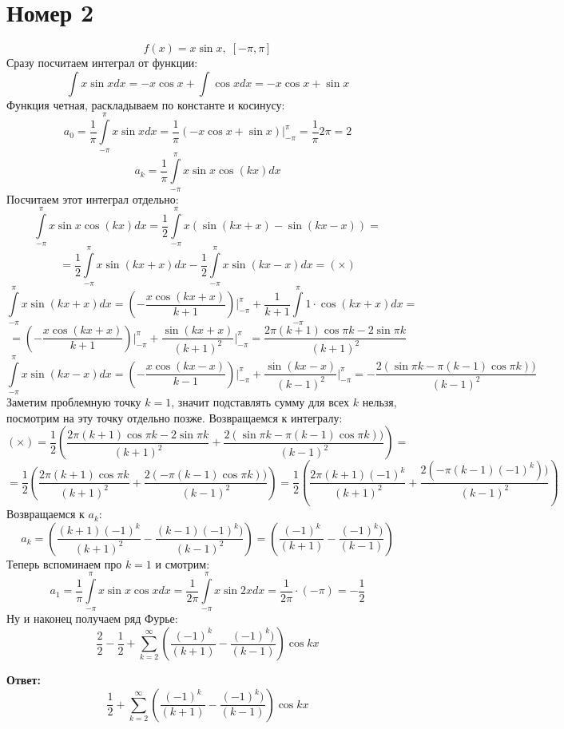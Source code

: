 \documentclass[a4paper,12pt]{article}
\begin{document}
\section*{Номер 2}
\[
f(x) = x \sin x, \; \left[ -\pi, \pi \right]
\]
Сразу посчитаем интеграл от функции:
\[
\int x \sin x dx = - x \cos x + \int \cos x dx = - x \cos x + \sin x
\]
Функция четная, раскладываем по константе и косинусу:
\[
a_0 = \frac{1}{\pi} \int\limits_{-\pi}^{\pi} x \sin x  dx= \frac{1}{\pi} \left(  - x \cos x + \sin x \right) \Bigg|_{-\pi}^{\pi} = \frac{1}{\pi} 2\pi = 2
\]
\[
a_k = \frac{1}{\pi} \int\limits_{-\pi}^{\pi} x \sin x \cos (kx) dx
\]
Посчитаем этот интеграл отдельно:
\[
\int\limits_{-\pi}^{\pi} x \sin x \cos (kx) dx = \frac{1}{2} \int\limits_{-\pi}^{\pi}x \left( \sin (kx + x) -\sin (kx - x)\right) =
\]
\[
=
 \frac{1}{2} \int\limits_{-\pi}^{\pi} x \sin (kx + x) dx -  \frac{1}{2} \int\limits_{-\pi}^{\pi}  x \sin (kx - x) dx = (\times)
\]
\[
\int\limits_{-\pi}^{\pi} x \sin (kx + x) dx  = \left(- \frac{x \cos (kx + x)}{k + 1}\right) \Bigg|_{-\pi}^{\pi} + \frac{1}{k + 1} \int\limits_{-\pi}^{\pi} 1 \cdot \cos (kx + x) dx = 
\]
\[
=
\left(- \frac{x \cos (kx + x)}{k + 1}\right) \Bigg|_{-\pi}^{\pi} + \frac{\sin (kx + x)}{(k + 1)^2} \Bigg|_{-\pi}^{\pi} = \frac{2\pi(k + 1) \cos \pi k - 2 \sin \pi k}{(k + 1)^2}
\]
\[
\int\limits_{-\pi}^{\pi} x \sin (kx - x) dx = \left(- \frac{x \cos (kx - x)}{k - 1}\right) \Bigg|_{-\pi}^{\pi} + \frac{\sin (kx - x)}{(k -  1)^2} \Bigg|_{-\pi}^{\pi} = -\frac{2(\sin \pi k - \pi(k - 1) \cos \pi k))}{(k - 1)^2}
\]
Заметим проблемную точку $k = 1$, значит подставлять сумму для всех $k$ нельзя, посмотрим на эту точку отдельно позже. Возвращаемся к интегралу:
\[
(\times) = \frac{1}{2} \left( 
 \frac{2\pi(k + 1) \cos \pi k - 2 \sin \pi k}{(k + 1)^2} + \frac{2(\sin \pi k - \pi(k - 1) \cos \pi k))}{(k - 1)^2}
\right) = 
\]
\[
=
\frac{1}{2} \left( 
 \frac{2\pi(k + 1) \cos \pi k}{(k + 1)^2} +\frac{2(- \pi(k - 1) \cos \pi k))}{(k - 1)^2}
\right)  = \frac{1}{2} \left( 
 \frac{2\pi(k + 1) (-1)^k}{(k + 1)^2} +\frac{2(- \pi(k - 1) (-1)^k))}{(k - 1)^2}
\right) 
\]
Возвращаемся к $a_k$:
\[
a_k =   \left( 
 \frac{(k + 1) (-1)^k}{(k + 1)^2} - \frac{(k - 1) (-1)^k)}{(k - 1)^2}
\right) = 
 \left( 
 \frac{ (-1)^k}{(k + 1)} -\frac{(-1)^k)}{(k - 1)}
\right) 
\]
Теперь вспоминаем про $k = 1$ и смотрим:
\[
a_1 = \frac{1}{\pi} \int\limits_{-\pi}^{\pi} x \sin x \cos x dx =  \frac{1}{2 \pi}  \int\limits_{-\pi}^{\pi} x \sin 2x dx = \frac{1}{2\pi} \cdot (-\pi) = - \frac{1}{2}
\]
Ну и наконец получаем ряд Фурье:
\[
\frac{2}{2} -\frac{1}{2} + \sum_{k = 2}^{\infty}   \left( 
 \frac{ (-1)^k}{(k + 1)} -\frac{(-1)^k)}{(k - 1)}
\right) \cos kx 
\]
\begin{center}
\textbf{Ответ: } 
\[
\frac{1}{2} + \sum_{k = 2}^{\infty}   \left( 
 \frac{ (-1)^k}{(k + 1)} - \frac{(-1)^k)}{(k - 1)}
\right) \cos kx 
\]
\end{center}
\clearpage
\end{document}
